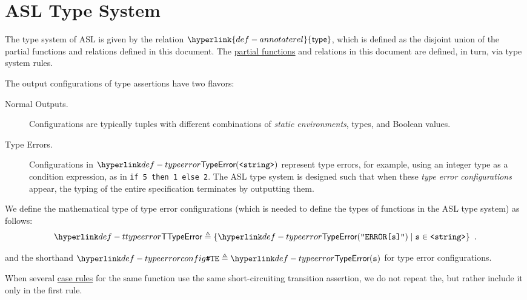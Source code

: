 \documentclass{book}
\newcommand\ProseOrTypeError[0]{\ProseTerminateAs{\TypeErrorConfig}}
\newcommand\annotaterel[0]{\hyperlink{def-annotaterel}{\textsf{type}}}
\newcommand\vs[0]{\texttt{s}}
\begin{document}

\section{ASL Type System}
\hypertarget{def-annotaterel}{}
The type system of ASL is given by the relation $\annotaterel$, which is defined as the disjoint union
of the partial functions and relations defined in this document.
The \hyperlink{def-partialfunc}{partial functions} and relations in this document are defined, in turn, via type system rules.

The output configurations of type assertions have two flavors:
\begin{description}
  \item[Normal Outputs.] \hypertarget{def-normal-type-outputs}{}
  Configurations are typically tuples with different combinations
  of \emph{static environments}, types, and Boolean values.

  \hypertarget{def-typeerror}{}
  \item[Type Errors.] Configurations in $\TypeError(\texttt{<string>})$
  represent type errors, for example, using an integer type as a condition expression, as in \verb|if 5 then 1 else 2|.
  The ASL type system is designed such that when these \emph{type error configurations} appear,
  the typing of the entire specification terminates by outputting them.
\end{description}

We define the mathematical type of type error configurations
(which is needed to define the types of functions in the ASL type system)
as follows:
\hypertarget{def-ttypeerror}{}
\[
  \TTypeError \triangleq \{\TypeErrorVal{\vs} \;|\; \vs \in \texttt{<string>} \} \enspace.
\]

\hypertarget{def-typeerrorconfig}{}
and the shorthand $\TypeErrorConfig \triangleq \TypeError(\vs)$ for type error configurations.

%
When several \hyperlink{def-caserules}{case rules} for the same function use the same short-circuiting transition assertion,
we do not repeat the\ProseOrTypeError, but rather include it only in the first rule.
\end{document}
